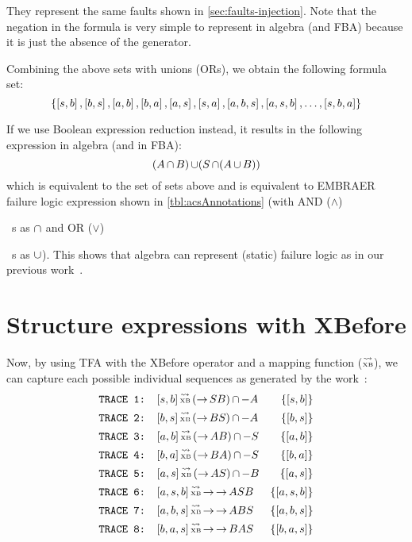 \documentclass[en,twoside,onehalfspacing,phd]{risethesis}
\newcommand{\EMBRAER}{EMBRAER\xspace}
\def\ortext{OR ($\lor$)%
  \gdef\ortext{OR\xspace}%
  \xspace
}
\def\andtext{AND ($\land$)%
  \gdef\andtext{AND\xspace}%
  \xspace
}
\def\xbeforeop{\ensuremath\rightarrow}
\newcommand{\xbefore}[2]{\ensuremath #1 \xbeforeop #2 }
\def\tracetoalgebra{\ensuremath\operatorname{\stackrel{\leadsto}{\text{\tiny XB}}}}
\newcommand{\listsin}[1]{\ensuremath\left[ #1 \right]}
\newcommand{\parsin}[1]{\ensuremath\left( #1 \right)}
\def\union{\ensuremath\operatorname{\cup}}
\def\inter{\ensuremath\operatorname{\cap}}
\def\xbefore{\ensuremath\operatorname{\rightarrow}}
\begin{document}
They represent the same faults shown in \cref{sec:faults-injection}.
Note that the negation in the formula is very simple to represent in \ac{algebra} (and \ac{FBA}) because it is just the absence of the generator.

Combining the above sets with unions (ORs), we obtain the following formula set:
%
\[
\left\{ \listsin{s,b}, \listsin{b,s}, \listsin{a,b}, \listsin{b,a}, \listsin{a,s}, \listsin{s,a}, \listsin{a,b,s}, \listsin{a,s,b},\ldots,\listsin{s,b,a} \right\}
\]

If we use Boolean expression reduction instead, it results in the following expression in \ac{algebra} (and in \ac{FBA}):
\[
(A \inter B) \union (S \inter (A \union B))
\]
%
which is equivalent to the set of sets above and is equivalent to \EMBRAER failure logic expression shown in \cref{tbl:acsAnnotations} (with \andtext\ s as $\inter$ and \ortext\ s as $\union$).
%
This shows that \ac{algebra} can represent (static) failure logic as in our previous work~\cite{DM2012}.

\section{Structure expressions with XBefore}
\label{sec:case-study-xbefore}

Now, by using TFA with the XBefore operator and a mapping function ($\tracetoalgebra$), we can capture each possible individual sequences as generated by the work~\cite{DM2012}:
%
\begin{align*}
\text{\texttt{TRACE 1: }}&[s,b] \tracetoalgebra \parsin{\xbefore{S}{B}} \inter -A & \left\{[s,b]\right\}\\
\text{\texttt{TRACE 2: }}&[b,s] \tracetoalgebra \parsin{\xbefore{B}{S}} \inter -A & \left\{[b,s]\right\}\\
\text{\texttt{TRACE 3: }}&[a,b] \tracetoalgebra \parsin{\xbefore{A}{B}} \inter -S & \left\{[a,b]\right\}\\
\text{\texttt{TRACE 4: }}&[b,a] \tracetoalgebra \parsin{\xbefore{B}{A}} \inter -S & \left\{[b,a]\right\}\\
\text{\texttt{TRACE 5: }}&[a,s] \tracetoalgebra \parsin{\xbefore{A}{S}} \inter -B & \left\{[a,s]\right\}\\
\text{\texttt{TRACE 6: }}&[a,s,b] \tracetoalgebra \xbefore{\xbefore{A}{S}}{B} & \left\{[a,s,b]\right\}\\
\text{\texttt{TRACE 7: }}&[a,b,s] \tracetoalgebra \xbefore{\xbefore{A}{B}}{S} & \left\{[a,b,s]\right\}\\
\text{\texttt{TRACE 8: }}&[b,a,s] \tracetoalgebra \xbefore{\xbefore{B}{A}}{S} & \left\{[b,a,s]\right\}
\end{align*}
\end{document}
